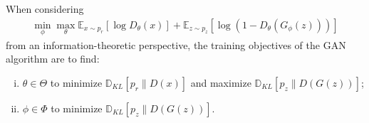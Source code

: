 \begin{proposition}%
	\label{thm:info-objective}%
	When considering
	\begin{align}
		\label{eq:consider}
		\min_\phi \max_\theta \mathbb{E}_{x \sim p_r}[\log D_\theta(x)] + \mathbb{E}_{z
		\sim p_z}[\log{(1 - D_\theta(G_\phi(z)))}]
	\end{align}
	from an information-theoretic perspective, the training objectives of the GAN algorithm are to find:
	\begin{enumerate}[(i)]
		\item $\theta \in \Theta$ to minimize $\mathbb{D}_{KL}[p_r \| D(x)]$ and
		      maximize $\mathbb{D}_{KL}[p_z \| D(G(z))]$;
		\item $\phi \in \Phi$ to minimize $\mathbb{D}_{KL}[p_z \| D(G(z))]$.
	\end{enumerate}
\end{proposition}

